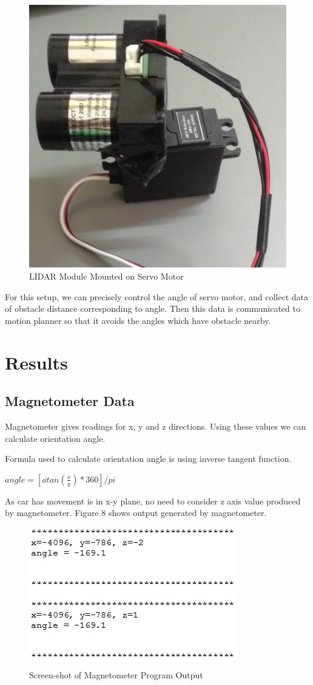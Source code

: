 \documentclass[conference]{IEEEtran}
\begin{document}
\begin{figure}[H]
\centering
\includegraphics[width=0.4\linewidth]{lidar_servo}
\caption{LIDAR Module Mounted on Servo Motor}
\label{fig:lidar_servo}
\end{figure}

For this setup, we can precisely control the angle of servo motor, and collect data of obstacle distance corresponding to angle. Then this data is communicated to motion planner so that it avoids the angles which have obstacle nearby. 

\section{Results}

\subsection{Magnetometer Data}
 Magnetometer gives readings for x, y and z directions. Using these values we can calculate orientation angle.
 
 Formula used to calculate orientation angle is using inverse tangent function.
 
 \begin{center}
 	$ angle = [atan(\frac{x}{y})*360] /pi $
 \end{center}
 
 
 As car has movement is in x-y plane, no need to consider z axis value produced by magnetometer. Figure 8 shows output generated by magnetometer. 
 
\begin{figure}[H]
\centering
\includegraphics[width=0.9\linewidth]{magneto}
\caption{Screen-shot of Magnetometer Program Output}
\end{figure}
\end{document}
